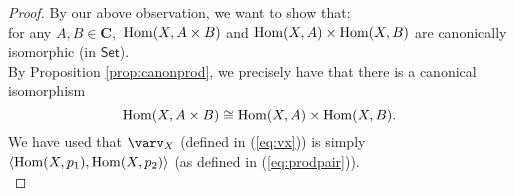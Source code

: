 \begin{proof} 
	By our above observation, we want to show that: \\
	for any $A, B \in \mathbf{C},$ $\operatorname{Hom}(X, A\times B)$ and $\operatorname{Hom}(X, A) \times \operatorname{Hom}(X, B)$ are canonically isomorphic (in $\mathsf{Set}$). \\
	By Proposition \ref{prop:canonprod}, we precisely have that there is a canonical isomorphism
	\begin{equation*} 
		\operatorname{Hom}(X, A \times B) \cong \operatorname{Hom}(X, A) \times \operatorname{Hom}(X, B).
	\end{equation*}
	We have used that $\varv_X$ (defined in (\ref{eq:vx})) is simply $\langle \operatorname{Hom}(X, p_1), \operatorname{Hom}(X, p_2)\rangle$ (as defined in (\ref{eq:prodpair})).\\

\end{proof}